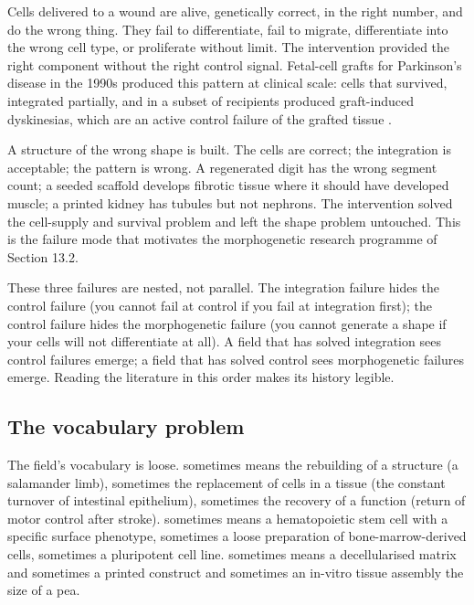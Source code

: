 Cells delivered to a wound are alive,
genetically correct, in the right number, and do the wrong thing. They
fail to differentiate, fail to migrate, differentiate into the wrong
cell type, or proliferate without limit. The intervention provided the
right component without the right control signal. Fetal-cell grafts
for Parkinson's disease in the 1990s produced this pattern at clinical
scale: cells that survived, integrated partially, and in a subset of
recipients produced graft-induced dyskinesias, which are an active
control failure of the grafted tissue
\cite{paper:v6c13-freed-fetal-parkinson-2001,
paper:v6c13-olanow-fetal-parkinson-2003}.

 A structure of the wrong shape is
built. The cells are correct; the integration is acceptable; the
pattern is wrong. A regenerated digit has the wrong segment count; a
seeded scaffold develops fibrotic tissue where it should have developed
muscle; a printed kidney has tubules but not nephrons. The intervention
solved the cell-supply and survival problem and left the shape problem
untouched. This is the failure mode that motivates the morphogenetic
research programme of Section 13.2.

These three failures are nested, not parallel. The integration failure
hides the control failure (you cannot fail at control if you fail at
integration first); the control failure hides the morphogenetic failure
(you cannot generate a shape if your cells will not differentiate at
all). A field that has solved integration sees control failures emerge;
a field that has solved control sees morphogenetic failures emerge.
Reading the literature in this order makes its history legible.

\subsection{The vocabulary problem}

The field's vocabulary is loose.  sometimes means
the rebuilding of a structure (a salamander limb), sometimes the
replacement of cells in a tissue (the constant turnover of intestinal
epithelium), sometimes the recovery of a function (return of motor
control after stroke).  sometimes means a
hematopoietic stem cell with a specific surface phenotype, sometimes a
loose preparation of bone-marrow-derived cells, sometimes a pluripotent
cell line.  sometimes means a
decellularised matrix and sometimes a printed construct and sometimes
an in-vitro tissue assembly the size of a pea.

